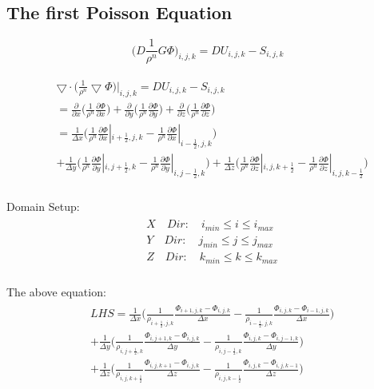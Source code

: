 \documentclass{article}
\numberwithin{equation}{subsection}
\begin{document}
\subsection{The first Poisson Equation}
\begin{equation}
\Big(D \frac{1}{\rho^n} G\Phi \Big)_{i,j,k} = DU_{i,j,k} - S_{i,j,k}
\end{equation}

\begin{align}
\begin{split}
& \bigtriangledown \cdot \Big( \frac{1}{\rho^n} \bigtriangledown \Phi \Big)|_{i,j,k} = DU_{i,j,k} - S_{i,j,k} \\
& = \frac{\partial }{\partial x} \Big (\frac{1}{\rho^n} \frac{\partial \Phi}{\partial x}\Big) 
+ \frac{\partial }{\partial y} \Big (\frac{1}{\rho^n} \frac{\partial \Phi}{\partial y}\Big)
+ \frac{\partial }{\partial z} \Big (\frac{1}{\rho^n} \frac{\partial \Phi}{\partial z}\Big) \\
& = \frac{1}{\Delta x}\Big(\frac{1}{\rho^n} \frac{\partial \Phi}{\partial x}|_{i+\frac{1}{2},j,k} - \frac{1}{\rho^n} \frac{\partial \Phi}{\partial x}|_{i-\frac{1}{2},j,k}\Big)  \\
& + \frac{1}{\Delta y}\Big(\frac{1}{\rho^n} \frac{\partial \Phi}{\partial y}|_{i,j+\frac{1}{2},k} - \frac{1}{\rho^n} \frac{\partial \Phi}{\partial y}|_{i,j-\frac{1}{2},k}\Big)
+   \frac{1}{\Delta z}\Big(\frac{1}{\rho^n} \frac{\partial \Phi}{\partial z}|_{i,j,k+\frac{1}{2}} - \frac{1}{\rho^n} \frac{\partial \Phi}{\partial z}|_{i,j,k-\frac{1}{2}}\Big) \\
\end{split}
\end{align}

Domain Setup:
\begin{align}
\begin{split}
& X \quad Dir: \quad i_{min} \leq i \leq i_{max} \\
& Y \quad Dir: \quad j_{min} \leq j \leq j_{max} \\
& Z \quad Dir: \quad k_{min} \leq k \leq k_{max} \\
\end{split}
\end{align}


The above equation:
\begin{align}
\begin{split}
& LHS = \frac{1}{\Delta x}\Big(\frac{1}{\rho_{i+\frac{1}{2},j,k}}\frac{\Phi_{i+1,j,k} - \Phi_{i,j,k}}{\Delta x} - \frac{1}{\rho_{i-\frac{1}{2},j,k}}\frac{\Phi_{i,j,k} - \Phi_{i-1,j,k}}{\Delta x}\Big) \\
& + \frac{1}{\Delta y}\Big(\frac{1}{\rho_{i,j+\frac{1}{2},k}}\frac{\Phi_{i,j+1,k} - \Phi_{i,j,k}}{\Delta y} - \frac{1}{\rho_{i,j-\frac{1}{2},k}}\frac{\Phi_{i,j,k} - \Phi_{i,j-1,k}}{\Delta y}\Big) \\
& + \frac{1}{\Delta z}\Big(\frac{1}{\rho_{i,j,k+\frac{1}{2}}}\frac{\Phi_{i,j,k+1} - \Phi_{i,j,k}}{\Delta z} - \frac{1}{\rho_{i,j,k-\frac{1}{2}}}\frac{\Phi_{i,j,k} - \Phi_{i,j,k-1}}{\Delta z}\Big)\\
\end{split}
\end{align}
\end{document}
